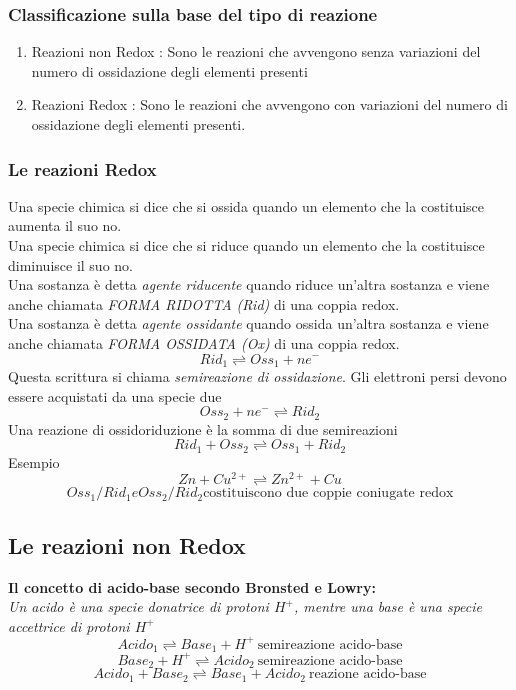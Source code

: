 \documentclass{article}
\begin{document}
\subsubsection{Classificazione sulla base del tipo di reazione}
\begin{enumerate}
    \item Reazioni non Redox : Sono le reazioni che avvengono senza variazioni del numero di ossidazione
        degli elementi presenti
         
    \item Reazioni Redox : Sono le reazioni che avvengono con variazioni del numero di ossidazione degli
            elementi presenti.
\end{enumerate}
\subsubsection*{Le reazioni Redox}
Una specie chimica si dice che si ossida quando un elemento che la costituisce aumenta il suo no.     \\
Una specie chimica si dice che si riduce quando un elemento che la costituisce diminuisce il suo no. \\
Una sostanza è detta \textit{agente riducente} quando riduce un'altra sostanza e viene anche chiamata \textit{FORMA RIDOTTA (Rid)}
di una coppia redox.\\
Una sostanza è detta \textit{agente ossidante} quando ossida un'altra sostanza e viene anche chiamata \textit{FORMA OSSIDATA (Ox)}
di una coppia redox.\\
\[Rid_1 \rightleftharpoons Oss_1 + ne^-\]
Questa scrittura si chiama \textit{semireazione di ossidazione}. Gli elettroni persi devono essere acquistati da una specie due
\[Oss_2 + ne^- \rightleftharpoons Rid_2\]
Una reazione di ossidoriduzione è la somma di due semireazioni
\[Rid_1 + Oss_2 \rightleftharpoons Oss_1 + Rid_2\]
Esempio
\[Zn + Cu^{2+} \rightleftharpoons Zn^{2+} + Cu\]
\[Oss_1/Rid_1 e Oss_2/Rid_2 \text{costituiscono due coppie coniugate redox}\]
\subsection*{Le reazioni non Redox}
\textbf{Il concetto di acido-base secondo Bronsted e Lowry:}\\ \textit{Un acido è una specie donatrice di protoni $H^+$, mentre una base 
è una specie accettrice di protoni $H^+$}\\
\[Acido_1 \rightleftharpoons Base_1 + H^+ \ \text{semireazione acido-base}\]
\[Base_2 + H^+ \rightleftharpoons Acido_2 \ \text{semireazione acido-base}\]
\[Acido_1 + Base_2 \rightleftharpoons Base_1 + Acido_2 \ \text{reazione acido-base}\]
\end{document}
